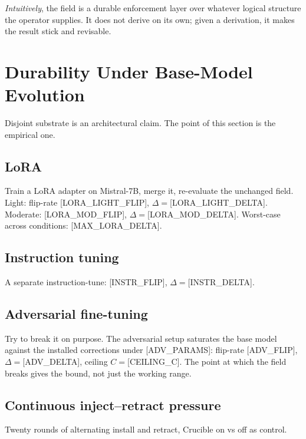 \documentclass[11pt,twocolumn]{article}
\newcommand{\PH}[1]{[\textsc{#1}]}
\theoremstyle{plain}
\begin{document}
\emph{Intuitively}, the field is a durable enforcement layer over whatever logical structure the operator supplies. It does not derive on its own; given a derivation, it makes the result stick and revisable.

\section{Durability Under Base-Model Evolution}
\label{sec:durability}

Disjoint substrate is an architectural claim. The point of this section is the empirical one.

\subsection{LoRA}

Train a LoRA adapter on Mistral-7B, merge it, re-evaluate the unchanged field. Light: flip-rate \PH{LORA\_LIGHT\_FLIP}, $\Delta{=}$\PH{LORA\_LIGHT\_DELTA}. Moderate: \PH{LORA\_MOD\_FLIP}, $\Delta{=}$\PH{LORA\_MOD\_DELTA}. Worst-case across conditions: \PH{MAX\_LORA\_DELTA}.

\subsection{Instruction tuning}

A separate instruction-tune: \PH{INSTR\_FLIP}, $\Delta{=}$\PH{INSTR\_DELTA}.

\subsection{Adversarial fine-tuning}

Try to break it on purpose. The adversarial setup saturates the base model against the installed corrections under \PH{ADV\_PARAMS}: flip-rate \PH{ADV\_FLIP}, $\Delta{=}$\PH{ADV\_DELTA}, ceiling $C{=}$\PH{CEILING\_C}. The point at which the field breaks gives the bound, not just the working range.

\subsection{Continuous inject--retract pressure}

Twenty rounds of alternating install and retract, Crucible on vs off as control.
\end{document}
